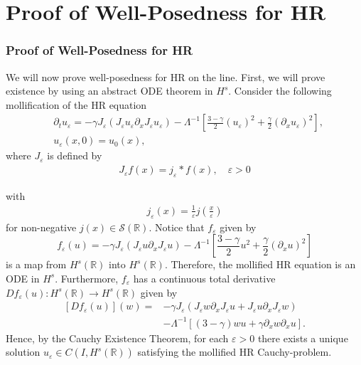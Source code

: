 \documentclass{beamer}
\newcommand{\rr}{\mathbb{R}}
\newcommand{\p}{\partial}
\newcommand{\ee}{\varepsilon}
\begin{document}
\section{Proof of Well-Posedness for HR}
\begin{frame}[allowframebreaks]
	\frametitle{Proof of Well-Posedness for HR}
%
%
%
%
%
We will now prove well-posedness for HR on the line.
%
%
%
%
%
First, we will prove existence by using an abstract ODE theorem in $H^s$. 
Consider the following mollification of the HR equation
%
%
\begin{align*}
& \p_t  u_\ee =
-\gamma J_\ee(J_\ee u_\ee \partial_x  J_\ee  u_\ee) - \Lambda^{-1} \left 
[\frac{3-\gamma}{2}(u_\ee)^2 + \frac{\gamma}{2}(\p_x u_\ee)^2 \right ],
\\
& u_\ee(x, 0) = u_0 (x),
\label{hr-moli-data}
\end{align*}
%
% 
%
%
%
%
%
%
where $J_\ee$ is defined  by
%
\begin{equation*}
\begin{split}
J_\ee f(x) = j_\ee * f(x), \quad \ee>0
\end{split}
\end{equation*}
%
\end{frame}

\begin{frame}
with 
%
\begin{equation*}
\begin{split}
j_\ee(x) = \frac{1}{\ee}j\left( \frac{x}{\ee} \right)
\end{split}
\end{equation*}
%
for non-negative $j(x) \in
\mathcal{S}(\rr)$. Notice that  $f_\ee$ given by 
%
%
\begin{equation*}
\label{f_ep}
f_{\ee}(u) = - \gamma J_\ee(J_\varepsilon u \partial_x J_\varepsilon u)
- \Lambda^{-1} \left
[\frac{3-\gamma}{2}u^2 + \frac{\gamma}{2}(\p_x u)^2 \right ]
\end{equation*}
%
is a map from $H^s(\rr)$  into $H^s(\rr)$. 
Therefore, the mollified HR equation 
is an ODE in $H^s$.
%
%
Furthermore, $f_\ee$ has a continuous total derivative $D f_\ee (u): 
H^s(\rr) \to H^s(\rr)$ given by
\begin{equation*}
	\label{total-deriv}
	\begin{split}
		[Df_{\ee}(u)](w)
		=
		& -\gamma J_\ee (J_\varepsilon w \partial_x J_\varepsilon u +
		J_\varepsilon u \partial_x J_\varepsilon w)
		\\
		& - \Lambda^{-1} \left [(3-\gamma)w u + \gamma\p_x w \p_x u \right ].
	\end{split}
\end{equation*}
Hence, by the Cauchy Existence Theorem, for each 
$\ee > 0$ there exists a
unique solution $u_\ee \in C(I, H^s(\rr))$ satisfying the mollified HR 
Cauchy-problem.
\end{frame}
%
%
%
%
\end{document}
